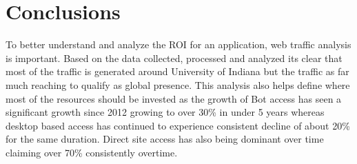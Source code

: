 \section{Conclusions}

To better understand and analyze the ROI for an application, web
traffic analysis is important. Based on the data collected, processed
and analyzed its clear that most of the traffic is generated around
University of Indiana but the traffic as far much reaching to qualify
as global presence. This analysis also helps define where most of the
resources should be invested as the growth of Bot access has seen a
significant growth since 2012 growing to over 30\% in under 5 years
whereas desktop based access has continued to experience consistent
decline of about 20\% for the same duration. Direct site access has
also being dominant over time claiming over 70\% consistently
overtime.
